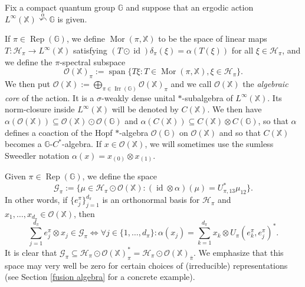 \documentclass[reqno]{amsart}
\numberwithin{equation}{section}
\DeclareMathOperator{\id}{\mathrm{id}}
\DeclareMathOperator{\Rep}{\mathrm{Rep}}
\DeclareMathOperator{\Irr}{\mathrm{Irr}}
\newcommand{\Mor}{\operatorname{Mor}}
\newcommand{\mcG}{\mathcal{G}}
\newcommand{\mcH}{\mathcal{H}}
\newcommand{\mcO}{\mathcal{O}}
\newcommand{\G}{\mathbb{G}}
\newcommand{\X}{\mathbb{X}}
\begin{document}
Fix a compact quantum group $\G$ and suppose that an ergodic action $L^\infty(\X)\stackrel{\alpha}\curvearrowleft \G$ is given. 

If $\pi\in \Rep(\G)$, we define 
$\Mor(\pi, \X)$ to be the space of linear maps $T: \mcH_\pi\to L^\infty(\X)$ satisfying $(T \odot \id)\delta_\pi(\xi) = \alpha (T(\xi))$ for all $\xi \in \mcH_\pi$, and we define the $\pi$-spectral subspace
$$\mcO(\X)_\pi:= \operatorname{span}\{T\xi: T \in \Mor(\pi, \X), \xi \in \mcH_\pi\}.$$
We then put $\mcO(\X):= \bigoplus_{\pi\in \Irr(\G)} \mcO(\X)_\pi$ and we call $\mcO(\X)$ the \emph{algebraic core} of the action. It is a $\sigma$-weakly dense unital $*$-subalgebra of $L^\infty(\X)$. Its norm-closure inside $L^\infty(\X)$ will be denoted by $C(\X)$. We then have $\alpha(\mcO(\X))\subseteq \mcO(\X) \odot \mcO(\G)$ and $\alpha(C(\X))\subseteq C(\X) \otimes C(\G)$, so that $\alpha$ defines a coaction of the Hopf $*$-algebra $\mcO(\G)$ on $\mcO(\X)$ and so that $C(\X)$ becomes a $\G$-$C^*$-algebra. If $x\in \mcO(\X)$, we will sometimes use the sumless Sweedler notation $\alpha(x)= x_{(0)}\otimes x_{(1)}$.

Given $\pi\in \Rep(\G)$, we define the space
$$\mcG_\pi:= \{\mu \in \mcH_\pi \odot \mcO(\X): (\id \otimes \alpha)(\mu)= U_{\pi,13}^*\mu_{12}\}.$$
In other words, if $\{e_j^\pi\}_{j=1}^{d_\pi}$ is an orthonormal basis for $\mcH_\pi$ and $x_1, \dots, x_{d_\pi}\in \mcO(\X)$, then
\begin{equation}\label{coordinates}\sum_{j=1}^{d_\pi} e_j^\pi\otimes x_j \in \mcG_\pi \iff \forall j \in \{1, \dots, d_\pi\}: \alpha(x_j) = \sum_{k=1}^{d_\pi} x_k\otimes U_\pi(e_k^\pi, e_j^\pi)^*.\end{equation}
It is clear that $\mcG_\pi\subseteq \mcH_\pi \odot \mcO(\X)_\pi^*= \mcH_\pi \odot \mcO(\X)_{\bar{\pi}}$.
We emphasize that this space may very well be zero for certain choices of (irreducible) representations (see Section \ref{fusion algebra} for a concrete example).
\end{document}

